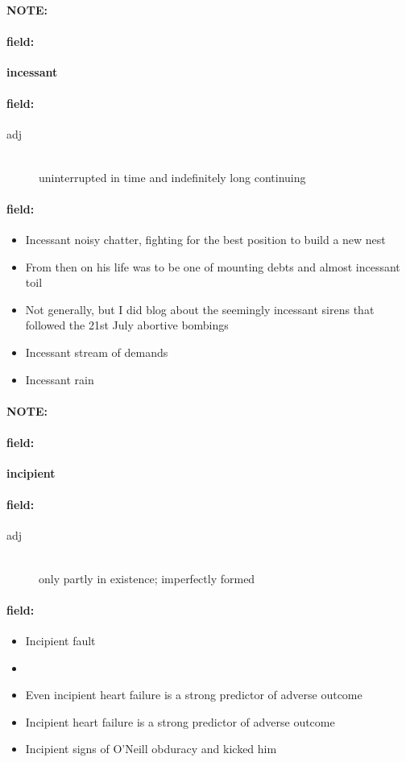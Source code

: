 \documentclass[12pt]{article}
\newenvironment{note}{\paragraph{NOTE:}}{}
\newenvironment{field}{\paragraph{field:}}{}
\begin{document}
\begin{note}
\begin{field}
\textbf{\large incessant}
\end{field}


\begin{field}
\begin{description}
\item[adj] \hfill \\ 
uninterrupted in time and indefinitely long continuing

\end{description}
\end{field}

\begin{field}
\begin{itemize}
\item Incessant noisy chatter, fighting for the best position to build a new nest
\item From then on his life was to be one of mounting debts and almost incessant toil
\item Not generally, but I did blog about the seemingly incessant sirens that followed the 21st July abortive bombings
\item Incessant stream of demands
\item Incessant rain
\end{itemize}
\end{field}
\end{note}
\begin{note}
\begin{field}
\textbf{\large incipient}
\end{field}


\begin{field}
\begin{description}
\item[adj] \hfill \\ 
only partly in existence; imperfectly formed

\end{description}
\end{field}

\begin{field}
\begin{itemize}
\item Incipient fault
\item 
\item Even incipient heart failure is a strong predictor of adverse outcome
\item Incipient heart failure is a strong predictor of adverse outcome
\item Incipient signs of O'Neill obduracy and kicked him
\end{itemize}
\end{field}
\end{note}
\end{document}
